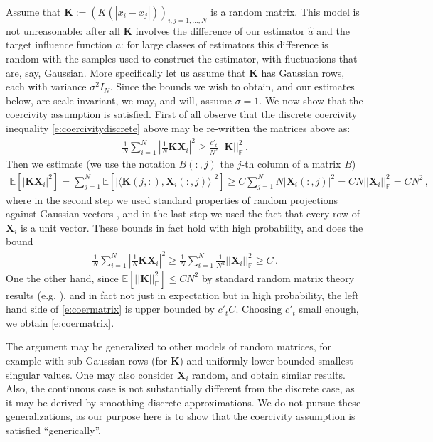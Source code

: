 Assume that $\mathbf{K}:=(K(|x_i-x_j|))_{i,j=1,\dots,N}$ is a random matrix. This model is not unreasonable: after all $\mathbf K$ involves the difference of our estimator $\widehat a$ and the target influence function $a$: for large classes of estimators this difference is random with the samples used to construct the estimator, with fluctuations that are, say, Gaussian. More specifically let us assume that $\mathbf K$ has Gaussian rows, each with variance $\sigma^2I_N$. %
Since the bounds we wish to obtain, and our estimates below, are scale invariant, we may, and will, assume $\sigma=1$.
We now show that the coercivity assumption is satisfied. First of all observe that the discrete coercivity inequality \eqref{e:coercivitydiscrete} above may be re-written the matrices above as:
\begin{align}
\frac 1N\sum_{i=1}^N\left|\frac1N\mathbf{K}\mathbf{X}_i\right|^2\ge\frac{c'_t}{N^2}||\mathbf{K}||^2_{\mathbb{F}}\,.
\label{e:coermatrix}
\end{align}
Then we estimate (we use the notation $B(:,j)$ the $j$-th column of a matrix $B$)
\begin{align*}
\mathbb{E}\left[|\mathbf{K}\mathbf{X}_i|^2\right]=\sum_{j=1}^N\mathbb{E}\left[|\langle \mathbf{K}(j,:),\mathbf{X}_i(:,j)\rangle|^2\right]\ge C\sum_{j=1}^N N |\mathbf{X}_i(:,j)|^2 = CN || \mathbf{X}_i||^2_{\mathbb{F}}=CN^2\,,
\end{align*}
where in the second step we used standard properties of random projections against Gaussian vectors \cite{Vershynin:NARMT}, and in the last step we used the fact that every row of $\mathbf{X}_i$ is a unit vector. These bounds in fact hold with high probability, and does the bound
\begin{align*}
\frac 1N\sum_{i=1}^N\left|\frac1N\mathbf{K}\mathbf{X}_i\right|^2\ge\frac{1}{N}\sum_{i=1}^N\frac1{N^2}||\mathbf{X}_i||^2_{\mathbb{F}}\ge C\,.
\end{align*}
One the other hand, since $\mathbb{E}[||\mathbf{K}||^2_{\mathbb{F}}]\le CN^2$ by standard random matrix theory results (e.g. \cite{Vershynin:NARMT}), and in fact not just in expectation but in high probability, the left hand side of \eqref{e:coermatrix} is upper bounded by $c'_t C$. Choosing $c'_t$ small enough, we obtain \eqref{e:coermatrix}.

The argument  may be generalized to other models of random matrices, for example with sub-Gaussian rows (for $\mathbf{K}$) and uniformly lower-bounded smallest singular values. One may also consider $\mathbf{X}_i$ random, and obtain similar results. Also, the continuous case is not substantially different from the discrete case, as it may be derived by smoothing discrete approximations. We do not pursue these generalizations, as our purpose here is to show that the coercivity assumption is satisfied ``generically''.


